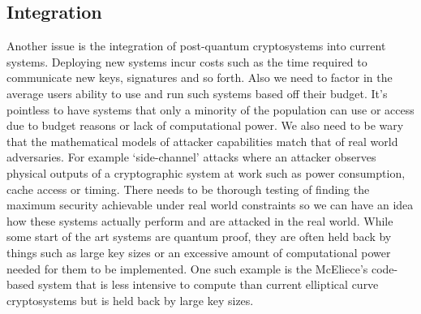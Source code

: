 \documentclass[10pt,a4paper]{article}
\begin{document}
\subsection{Integration}
Another issue is the integration of post-quantum cryptosystems into current systems. Deploying new systems incur costs such as the time required to communicate new keys, signatures and so forth. Also we need to factor in the average users ability to use and run such systems based off their budget. It's pointless to have systems that only a minority of the population can use or access due to budget reasons or lack of computational power.
\newline
We also need to be wary that the mathematical models of attacker capabilities match that of real world adversaries. For example `side-channel' attacks where an attacker observes physical outputs of a cryptographic system at work such as power consumption, cache access or timing. There needs to be thorough testing of finding the maximum security achievable under real world constraints so we can have an idea how these systems actually perform and are attacked in the real world.
\newline
While some start of the art systems are quantum proof, they are often held back by things such as large key sizes or an excessive amount of computational power needed for them to be implemented. One such example is the McEliece's code-based system that is less intensive to compute than current elliptical curve cryptosystems but is held back by large key sizes.
\end{document}
